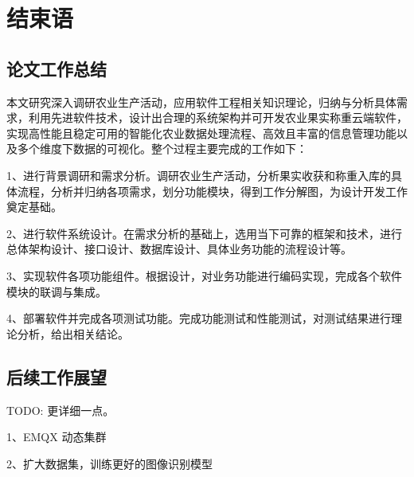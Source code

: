 \chapter{结束语}

\section{论文工作总结}

本文研究深入调研农业生产活动，应用软件工程相关知识理论，归纳与分析具体需求，利用先进软件技术，设计出合理的系统架构并可开发农业果实称重云端软件，实现高性能且稳定可用的智能化农业数据处理流程、高效且丰富的信息管理功能以及多个维度下数据的可视化。整个过程主要完成的工作如下：

1、进行背景调研和需求分析。调研农业生产活动，分析果实收获和称重入库的具体流程，分析并归纳各项需求，划分功能模块，得到工作分解图，为设计开发工作奠定基础。

2、进行软件系统设计。在需求分析的基础上，选用当下可靠的框架和技术，进行总体架构设计、接口设计、数据库设计、具体业务功能的流程设计等。

3、实现软件各项功能组件。根据设计，对业务功能进行编码实现，完成各个软件模块的联调与集成。

4、部署软件并完成各项测试功能。完成功能测试和性能测试，对测试结果进行理论分析，给出相关结论。

\section{后续工作展望}

TODO: 更详细一点。

1、EMQX 动态集群

2、扩大数据集，训练更好的图像识别模型